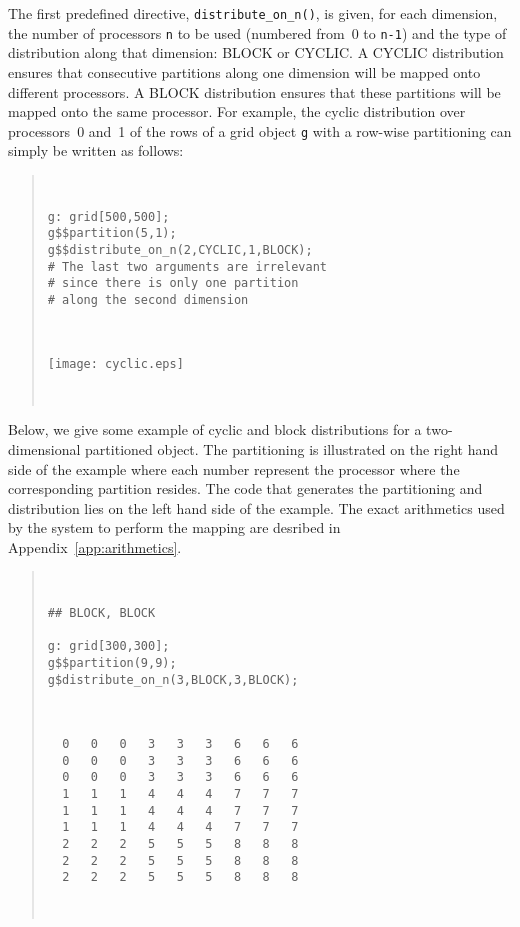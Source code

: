 \documentclass{article}
\newenvironment{example}
  {\begin{quote} ~\hrulefill }
  {~\hrulefill \end{quote} }
\begin{document}
\begin{enumerate}
The first predefined directive, \verb+distribute_on_n()+, is given,
for each dimension, the number of processors \verb+n+ to be used
(numbered from~0 to \verb+n-1+) and the type of distribution along
that dimension: BLOCK or CYCLIC. A CYCLIC distribution ensures that
consecutive partitions along one dimension will be mapped onto
different processors. A BLOCK distribution ensures that these
partitions will be mapped onto the same processor. For example, the
cyclic distribution over processors~0 and~1 of the rows of a grid
object \verb+g+ with a row-wise partitioning can simply be written as
follows:

\begin{example}

\begin{minipage}{3.5in}
\begin{verbatim}
g: grid[500,500];
g$$partition(5,1);   
g$$distribute_on_n(2,CYCLIC,1,BLOCK); 
# The last two arguments are irrelevant 
# since there is only one partition
# along the second dimension
\end{verbatim} 
\end{minipage} \ \
\begin{minipage}{2.5in}
\texttt{[image: cyclic.eps]}
\end{minipage}

\end{example}

Below, we give some example of cyclic and block distributions for a
two-dimensional partitioned object. The partitioning is illustrated on
the right hand side of the example where each number represent the
processor where the corresponding partition resides. The code that
generates the partitioning and distribution lies on the left hand side
of the example. The exact arithmetics used by the system to perform
the mapping are desribed in Appendix~\ref{app:arithmetics}.

\begin{example}

\begin{minipage}{3.5in}
\begin{verbatim}
## BLOCK, BLOCK

g: grid[300,300];
g$$partition(9,9);
g$distribute_on_n(3,BLOCK,3,BLOCK);
\end{verbatim}
\end{minipage} \ \
\begin{minipage}{2.5in}
\begin{verbatim}
  0   0   0   3   3   3   6   6   6 
  0   0   0   3   3   3   6   6   6 
  0   0   0   3   3   3   6   6   6 
  1   1   1   4   4   4   7   7   7 
  1   1   1   4   4   4   7   7   7 
  1   1   1   4   4   4   7   7   7 
  2   2   2   5   5   5   8   8   8 
  2   2   2   5   5   5   8   8   8 
  2   2   2   5   5   5   8   8   8 
\end{verbatim}
\end{minipage}


\end{example}
\end{enumerate}
\end{document}
